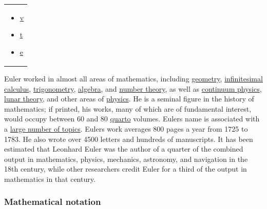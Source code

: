 \begin{longtable}[]{@{}
  >{\raggedright\arraybackslash}p{}@{}}
\begin{minipage}[t]{\linewidth}\raggedright
\begin{itemize}
\tightlist
\item
  \href{https://en.wikipedia.org/wiki/Template:E_(mathematical_constant)}{{v}}
\item
  \href{https://en.wikipedia.org/wiki/Template_talk:E_(mathematical_constant)}{{t}}
\item
  \href{https://en.wikipedia.org/wiki/Special:EditPage/Template:E_(mathematical_constant)}{{e}}
\end{itemize}
\end{minipage} \\
\end{longtable}

Euler worked in almost all areas of mathematics, including \href{https://en.wikipedia.org/wiki/Geometry}{geometry}, \href{https://en.wikipedia.org/wiki/Infinitesimal_calculus}{infinitesimal calculus}, \href{https://en.wikipedia.org/wiki/Trigonometry}{trigonometry}, \href{https://en.wikipedia.org/wiki/Algebra}{algebra}, and \href{https://en.wikipedia.org/wiki/Number_theory}{number theory}, as well as \href{https://en.wikipedia.org/wiki/Continuum_physics}{continuum physics}, \href{https://en.wikipedia.org/wiki/Lunar_theory}{lunar theory}, and other areas of \href{https://en.wikipedia.org/wiki/Physics}{physics}. He is a seminal figure in the history of mathematics; if printed, his works, many of which are of fundamental interest, would occupy between 60 and 80 \href{https://en.wikipedia.org/wiki/Quarto_(text)}{quarto} volumes. Euler\textquotesingle s name is associated with a \href{https://en.wikipedia.org/wiki/List_of_topics_named_after_Leonhard_Euler}{large number of topics}. Euler\textquotesingle s work averages 800 pages a year from 1725 to 1783. He also wrote over 4500 letters and hundreds of manuscripts. It has been estimated that Leonhard Euler was the author of a quarter of the combined output in mathematics, physics, mechanics, astronomy, and navigation in the 18th century, while other researchers credit Euler for a third of the output in mathematics in that century.


\subsubsection{Mathematical notation}\label{Mathematical_notation}

